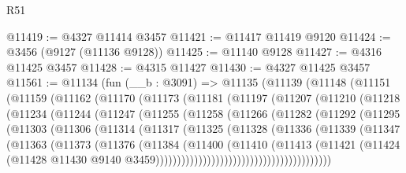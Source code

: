 \begin{lexlean}{R51}
\begin{coremodule}
@11419 := @4327 @11414 @3457
@11421 := @11417 @11419 @9120
@11424 := @3456 (@9127 (@11136 @9128))
@11425 := @11140 @9128
@11427 := @4316 @11425 @3457
@11428 := @4315 @11427
@11430 := @4327 @11425 @3457
@11561 := @11134
    (fun (__b : @3091) =>
    @11135
      (@11139
        (@11148
          (@11151
            (@11159
              (@11162
                (@11170
                  (@11173
                    (@11181
                      (@11197
                        (@11207
                          (@11210
                            (@11218
                              (@11234
                                (@11244
                                  (@11247
                                    (@11255
                                      (@11258
                                        (@11266
                                          (@11282
                                            (@11292
                                              (@11295
                                                (@11303
                                                  (@11306
                                                    (@11314
                                                      (@11317
                                                        (@11325
                                                          (@11328
                                                            (@11336
                                                              (@11339
                                                                (@11347
                                                                  (@11363
                                                                    (@11373
                                                                      (@11376
                                                                        (@11384
                                                                          (@11400
                                                                            (@11410
                                                                              (@11413
                                                                                (@11421
                                                                                  (@11424
                                                                                    (@11428
                                                                                      @11430
                                                                                      @9140
                                                                                      @3459)))))))))))))))))))))))))))))))))))))))))

\end{coremodule}
\end{lexlean}
